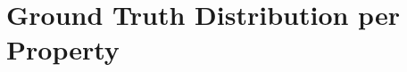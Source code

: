 
\clearpage
\section{Ground Truth Distribution per Property}
\label{appendix:property_ground_truth}

